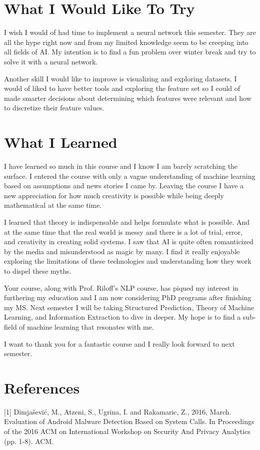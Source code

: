 \documentclass[a4paper, 11pt]{article} %
\begin{document}
\section*{What I Would Like To Try}

I wish I would of had time to implement a neural network this semester. They are all the hype right now and from my limited knowledge seem to be creeping into all fields of AI. My intention is to find a fun problem over winter break and try to solve it with a neural network.

Another skill I would like to improve is visualizing and exploring datasets. I would of liked to have better tools and exploring the feature set so I could of made smarter decisions about determining which features were relevant and how to discretize their feature values.

\section*{What I Learned}

I have learned so much in this course and I know I am barely scratching the surface. I entered the course with only a vague understanding of machine learning based on assumptions and news stories I came by. Leaving the course I have a new appreciation for how much creativity is possible while being deeply mathematical at the same time.

I learned that theory is indispensable and helps formulate what is possible. And at the same time that the real world is messy and there is a lot of trial, error, and creativity in creating solid systems. I saw that AI is quite often romanticized by the media and misunderstood as magic by many. I find it really enjoyable exploring the limitations of these technologies and understanding how they work to dispel these myths. 

Your course, along with Prof. Riloff's NLP course, has piqued my interest in furthering my education and I am now considering PhD programs after finishing my MS. Next semester I will be taking Structured Prediction, Theory of Machine Learning, and Information Extraction to dive in deeper. My hope is to find a sub-field of machine learning that  resonates with me.

I want to thank you for a fantastic course and I really look forward to next semester.
\section*{References}
[1] Dimja\v{s}evi\'{c}, M., Atzeni, S., Ugrina, I. and Rakamaric, Z., 2016, March. Evaluation of Android Malware Detection Based on System Calls. In Proceedings of the 2016 ACM on International Workshop on Security And Privacy Analytics (pp. 1-8). ACM.
\end{document}
